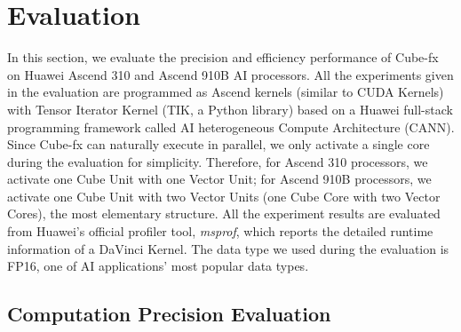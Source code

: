 \section{Evaluation \label{sec:5}}

In this section, we evaluate the precision and efficiency performance of Cube-fx on Huawei Ascend 310 and Ascend 910B AI processors. All the experiments given in the evaluation are programmed as Ascend kernels (similar to CUDA Kernels) with Tensor Iterator Kernel (TIK, a Python library) based on a Huawei full-stack programming framework called AI heterogeneous Compute Architecture (CANN). Since Cube-fx can naturally execute in parallel, we only activate a single core during the evaluation for simplicity. Therefore, for Ascend 310 processors, we activate one Cube Unit with one Vector Unit; for Ascend 910B processors, we activate one Cube Unit with two Vector Units (one Cube Core with two Vector Cores), the most elementary structure. All the experiment results are evaluated from Huawei's official profiler tool, \textit{msprof}, which reports the detailed runtime information of a DaVinci Kernel. The data type we used during the evaluation is FP16, one of AI applications' most popular data types.

\subsection{Computation Precision Evaluation \label{Sec: 4.1}}

